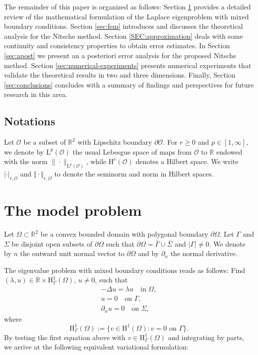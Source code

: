 \documentclass[onefignum,onetabnum,final]{siamart250211}
\numberwithin{equation}{section}
\newcommand\0{\boldsymbol{0}}
\newcommand\R{\mathbb{R}}
\renewcommand\O{\Omega}
\newcommand\G{\Gamma}
\renewcommand\H{\mathrm{H}}
\newcommand\HcuO{\H_{\G}^1(\O)}
\renewcommand\S{\Sigma}
\def\l{\lambda}
\begin{document}
	The remainder of this paper is organized as follows: Section \ref{sec:model} provides a detailed review of the mathematical formulation of the Laplace eigenproblem with mixed boundary conditions. Section \ref{sec:fem} introduces and discusses the theoretical analysis for the Nitsche method. Section \ref{SEC:approximation} deals with some continuity and consistency properties to obtain error estimates. In Section \ref{sec:apost} we present an a posteriori error analysis for the proposed Nitsche method. Section \ref{sec:numerical-experiments} presents numerical experiments that validate the theoretical results in two and three dimensions. Finally, Section \ref{sec:conclusions} concludes with a summary of findings and perspectives for future research in this area.
	
	\subsection{Notations}\label{sec:notations}
	Let $\mathcal{O}$ be a subset of $\mathbb{R}^2$ with Lipschitz boundary $\partial\mathcal{O}$.   For $r \geq 0$ and $p \in[1, \infty]$, we denote by $\mathrm{L}^p(\mathcal{O})$ the usual Lebesgue space of maps from $\mathcal{O}$ to $\mathbb{R}$ endowed with the norm $\|\cdot\|_{\mathrm{L}^p(\mathcal{O})}$, while $\H^r(\mathcal{O})$ denotes a Hilbert space. We write $|\cdot|_{r, \mathcal{O}}$ and $\Vert \cdot\Vert_{r,\Omega}$ to denote the seminorm and norm in Hilbert spaces.
	
	\section{The model problem}
	\label{sec:model}
	
	Let $\O\subset\R^2$ be a convex bounded domain with polygonal boundary
	$\partial\O$. Let $\G$ and $\S$ be disjoint open subsets of
	$\partial\O$ such that $\partial\O=\bar{\G}\cup\bar{\S}$ and
	$\left|\G\right|\ne0$. We denote by $n$ the outward unit normal vector
	to $\partial\O$ and by $\partial_n$ the normal derivative.
	
	
	The eigenvalue problem with mixed boundary conditions reads as follows:
	Find $(\l,u)\in\R\times\HcuO$, $u\ne0$, such that
	\begin{equation}\label{eq:strong-formulation}
		\begin{split}
			-\Delta u=\l u\quad\text{in }\O,\\
			u=0\quad\text{on }\G,\\
			\partial_n u=0\quad\text{on }\S,
		\end{split}
	\end{equation}
	where
	$$
	\HcuO:=\{v\in\H^1(\Omega): v=0 \text{ on } \Gamma\}.
	$$
	By testing the first equation above with $v\in\HcuO$ and integrating by
	parts, we arrive at the following equivalent variational formulation:
	
\end{document}
